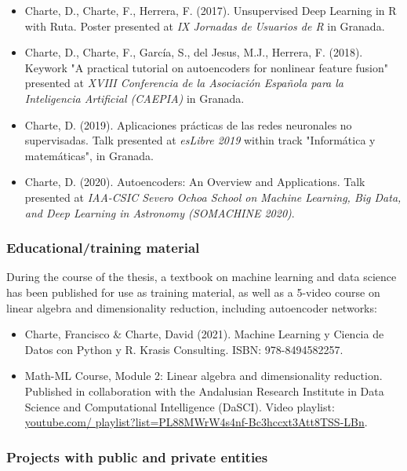 \begin{itemize}
    \item Charte, D., Charte, F., Herrera, F. (2017). Unsupervised Deep Learning in R with Ruta. Poster presented at \textit{IX Jornadas de Usuarios de R} in Granada.
    \item Charte, D., Charte, F., García, S., del Jesus, M.J., Herrera, F. (2018). Keywork "A practical tutorial on autoencoders for nonlinear feature fusion" presented at \textit{XVIII Conferencia de la Asociación Española para la Inteligencia Artificial (CAEPIA)} in Granada.
    \item Charte, D. (2019). Aplicaciones prácticas de las redes neuronales no supervisadas. Talk presented at \textit{esLibre 2019} within track "Informática y matemáticas", in Granada.
    \item Charte, D. (2020). Autoencoders: An Overview and Applications. Talk presented at \textit{IAA-CSIC Severo Ochoa School on Machine Learning, Big Data, and Deep Learning in Astronomy (SOMACHINE 2020)}.
\end{itemize}

\subsubsection{Educational/training material}

During the course of the thesis, a textbook on machine learning and data science has been published for use as training material, as well as a 5-video course on linear algebra and dimensionality reduction, including autoencoder networks:

\begin{itemize}
    \item Charte, Francisco \& Charte, David (2021). Machine Learning y Ciencia de Datos con Python y R. Krasis Consulting. ISBN: 978-8494582257.
    \item Math-ML Course, Module 2: Linear algebra and dimensionality reduction. Published in collaboration with the Andalusian Research Institute in Data Science and Computational Intelligence (DaSCI). Video playlist: \href{https://www.youtube.com/playlist?list=PL88MWrW4s4nf-Bc3hccxt3Att8TSS-LBn}{youtube.com/ playlist?list=PL88MWrW4s4nf-Bc3hccxt3Att8TSS-LBn}.
\end{itemize}

\subsubsection{Projects with public and private entities}


